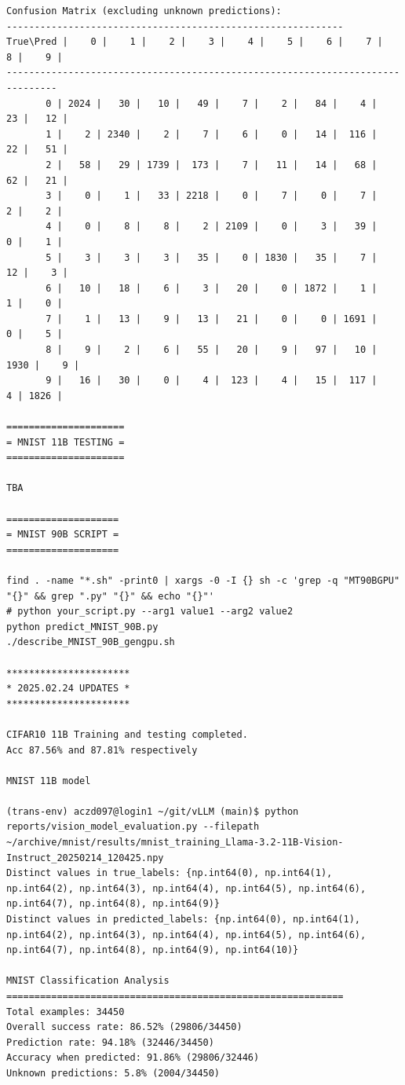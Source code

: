 \begin{verbatim}
Confusion Matrix (excluding unknown predictions):
------------------------------------------------------------
True\Pred |    0 |    1 |    2 |    3 |    4 |    5 |    6 |    7 |    8 |    9 |
-------------------------------------------------------------------------------
       0 | 2024 |   30 |   10 |   49 |    7 |    2 |   84 |    4 |   23 |   12 |
       1 |    2 | 2340 |    2 |    7 |    6 |    0 |   14 |  116 |   22 |   51 |
       2 |   58 |   29 | 1739 |  173 |    7 |   11 |   14 |   68 |   62 |   21 |
       3 |    0 |    1 |   33 | 2218 |    0 |    7 |    0 |    7 |    2 |    2 |
       4 |    0 |    8 |    8 |    2 | 2109 |    0 |    3 |   39 |    0 |    1 |
       5 |    3 |    3 |    3 |   35 |    0 | 1830 |   35 |    7 |   12 |    3 |
       6 |   10 |   18 |    6 |    3 |   20 |    0 | 1872 |    1 |    1 |    0 |
       7 |    1 |   13 |    9 |   13 |   21 |    0 |    0 | 1691 |    0 |    5 |
       8 |    9 |    2 |    6 |   55 |   20 |    9 |   97 |   10 | 1930 |    9 |
       9 |   16 |   30 |    0 |    4 |  123 |    4 |   15 |  117 |    4 | 1826 |

=====================
= MNIST 11B TESTING =
=====================  

TBA

====================
= MNIST 90B SCRIPT =
====================

find . -name "*.sh" -print0 | xargs -0 -I {} sh -c 'grep -q "MT90BGPU" "{}" && grep ".py" "{}" && echo "{}"'
# python your_script.py --arg1 value1 --arg2 value2
python predict_MNIST_90B.py
./describe_MNIST_90B_gengpu.sh

**********************
* 2025.02.24 UPDATES *
**********************

CIFAR10 11B Training and testing completed.
Acc 87.56% and 87.81% respectively

MNIST 11B model

(trans-env) aczd097@login1 ~/git/vLLM (main)$ python reports/vision_model_evaluation.py --filepath ~/archive/mnist/results/mnist_training_Llama-3.2-11B-Vision-Instruct_20250214_120425.npy
Distinct values in true_labels: {np.int64(0), np.int64(1), np.int64(2), np.int64(3), np.int64(4), np.int64(5), np.int64(6), np.int64(7), np.int64(8), np.int64(9)}
Distinct values in predicted_labels: {np.int64(0), np.int64(1), np.int64(2), np.int64(3), np.int64(4), np.int64(5), np.int64(6), np.int64(7), np.int64(8), np.int64(9), np.int64(10)}

MNIST Classification Analysis
============================================================
Total examples: 34450
Overall success rate: 86.52% (29806/34450)
Prediction rate: 94.18% (32446/34450)
Accuracy when predicted: 91.86% (29806/32446)
Unknown predictions: 5.8% (2004/34450)


\end{verbatim}
